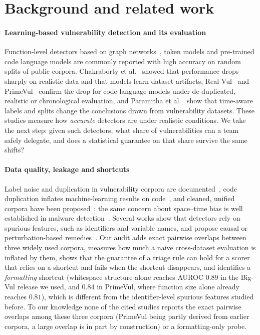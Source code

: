\section{Background and related work}\label{sec:related}

\paragraph{Learning-based vulnerability detection and its evaluation}
Function-level detectors based on graph networks~\cite{zhou2019devign}, token models and pre-trained code language models are commonly reported with high accuracy on random splits of public corpora. Chakraborty et al.~\cite{chakraborty2021deep} showed that performance drops sharply on realistic data and that models learn dataset artifacts; Real-Vul~\cite{chakraborty2024realvul} and PrimeVul~\cite{ding2024primevul} confirm the drop for code language models under de-duplicated, realistic or chronological evaluation, and Paramitha et al.~\cite{paramitha2025cat} show that time-aware labels and splits change the conclusions drawn from vulnerability datasets. These studies measure how \emph{accurate} detectors are under realistic conditions. We take the next step: given such detectors, what share of vulnerabilities can a team safely delegate, and does a statistical guarantee on that share survive the same shifts?

\paragraph{Data quality, leakage and shortcuts}
Label noise and duplication in vulnerability corpora are documented~\cite{croft2023data,yadav2024rr}, code duplication inflates machine-learning results on code~\cite{allamanis2019adverse}, and cleaned, unified corpora have been proposed~\cite{safdar2025vulgate}; the same concern about space--time bias is well established in malware detection~\cite{pendlebury2019tesseract}. Several works show that detectors rely on spurious features, such as identifiers and variable names, and propose causal or perturbation-based remedies~\cite{rahman2024causal,das2025features}. Our audit adds exact pairwise overlaps between three widely used corpora, measures how much a naive cross-dataset evaluation is inflated by them, shows that the guarantee of a triage rule can hold for a scorer that relies on a shortcut and fails when the shortcut disappears, and identifies a \emph{formatting} shortcut (whitespace structure alone reaches AUROC $0.89$ in the Big-Vul release we used, and $0.84$ in PrimeVul, where function size alone already reaches $0.81$), which is different from the identifier-level spurious features studied before. To our knowledge none of the cited studies reports the exact pairwise overlaps among these three corpora (PrimeVul being partly derived from earlier corpora, a large overlap is in part by construction) or a formatting-only probe.

